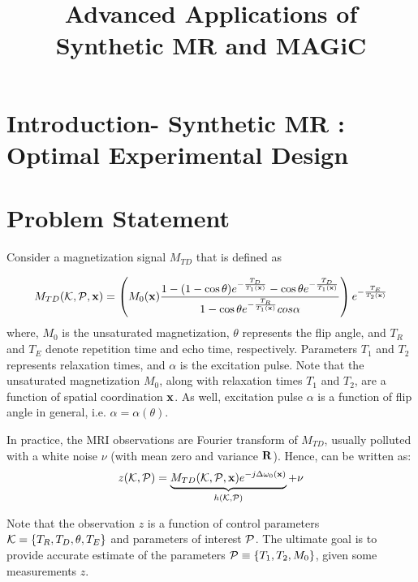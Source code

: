 \documentclass{article}         %
\title{Advanced Applications of Synthetic MR and MAGiC}
\author{}
\theoremstyle{definition}
\theoremstyle{remark}
\begin{document}
\maketitle

\section*{Introduction-
Synthetic MR : Optimal Experimental Design }


\section*{Problem Statement}\label{sec:prob_statement}
Consider a magnetization signal $M_{TD}$ that is defined as

\begin{equation}\label{mtd}
M_{TD}(\mathcal{K},\mathcal{P},\mathbf{x})=\left(M_0(\mathbf{x})\frac{1-(1-\cos \theta)e^{-\frac{T_D}{T_1(\mathbf{x})}}-\cos \theta e^{-\frac{T_D}{T_1(\mathbf{x})}}}{1-\cos \theta e^{-\frac{T_R}{T_1(\mathbf{x})}}cos \alpha}\right) e^{-\frac{T_E}{T_2(\mathbf{x})}}
\end{equation}
where, $M_0$ is the unsaturated magnetization, $\theta$ represents the flip angle, and $T_R$ and $T_E$ denote repetition time and echo time, respectively. Parameters $T_1$ and $T_2$ represents relaxation times, and $\alpha$ is the excitation pulse. Note that the unsaturated magnetization $M_0$, along with relaxation times $T_1$ and $T_2$, are a function of spatial coordination $\mathbf{x}$. As well, excitation pulse $\alpha$ is a function of flip angle in general, i.e. $\alpha=\alpha(\theta)$.

In practice, the MRI observations are Fourier transform of $M_{TD}$, usually polluted with a white noise $\nu$ (with mean zero and variance $\mathbf{R}$). Hence,  can be written as:
\begin{equation}\label{mtdobs}
z(\mathcal{K},\mathcal{P})=\underbrace{M_{TD}(\mathcal{K},\mathcal{P},\mathbf{x})e^{-j\Delta\omega_0(\mathbf{x})}}_{h(\mathcal{K},\mathcal{P})}+\nu\textbf{}
\end{equation}

Note that the observation $z$ is a function of control parameters $\mathcal{K}=\{T_R,T_D,\theta,T_E\}$ and parameters of interest $\mathcal{P}$. %
The ultimate goal is to provide accurate estimate of the parameters $\mathcal{P}\equiv \{T_1,T_2,M_0\}$, given some measurements $z$. 
\end{document}
